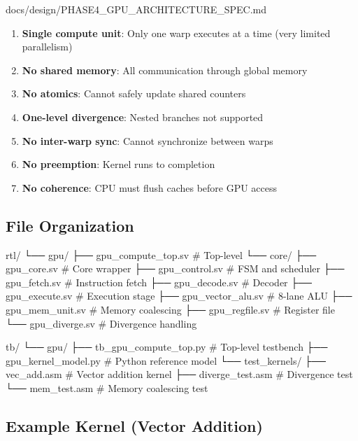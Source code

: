 \begin{relocated}{docs/design/PHASE4_GPU_ARCHITECTURE_SPEC.md}
\begin{enumerate}
\def\labelenumi{\arabic{enumi}.}
\tightlist
\item
  \textbf{Single compute unit}: Only one warp executes at a time (very
  limited parallelism)
\item
  \textbf{No shared memory}: All communication through global memory
\item
  \textbf{No atomics}: Cannot safely update shared counters
\item
  \textbf{One-level divergence}: Nested branches not supported
\item
  \textbf{No inter-warp sync}: Cannot synchronize between warps
\item
  \textbf{No preemption}: Kernel runs to completion
\item
  \textbf{No coherence}: CPU must flush caches before GPU access
\end{enumerate}

\subsection{File Organization}\label{ds:ch:phase4-gpu-architecture:file-organization}

\begin{textblock}
rtl/
└── gpu/
    ├── gpu_compute_top.sv      # Top-level
    └── core/
        ├── gpu_core.sv         # Core wrapper
        ├── gpu_control.sv      # FSM and scheduler
        ├── gpu_fetch.sv        # Instruction fetch
        ├── gpu_decode.sv       # Decoder
        ├── gpu_execute.sv      # Execution stage
        ├── gpu_vector_alu.sv   # 8-lane ALU
        ├── gpu_mem_unit.sv     # Memory coalescing
        ├── gpu_regfile.sv      # Register file
        └── gpu_diverge.sv      # Divergence handling

tb/
└── gpu/
    ├── tb_gpu_compute_top.py   # Top-level testbench
    ├── gpu_kernel_model.py     # Python reference model
    └── test_kernels/
        ├── vec_add.asm         # Vector addition kernel
        ├── diverge_test.asm    # Divergence test
        └── mem_test.asm        # Memory coalescing test
\end{textblock}

\subsection{Example Kernel (Vector Addition)}\label{ds:ch:phase4-gpu-architecture:example-kernel-vector-addition}


\end{relocated}
